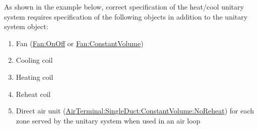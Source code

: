 As shown in the example below, correct specification of the heat/cool unitary system requires specification of the following objects in addition to the unitary system object:

\begin{enumerate}
\def\labelenumi{\arabic{enumi})}
\item
  Fan (\hyperref[fanonoff]{Fan:OnOff} or \hyperref[fanconstantvolume]{Fan:ConstantVolume})
\item
  Cooling coil
\item
  Heating coil
\item
  Reheat coil
\item
  Direct air unit (\hyperref[airterminalsingleductconstantvolumenoreheat]{AirTerminal:SingleDuct:ConstantVolume:NoReheat}) for each zone served by the unitary system when used in an air loop
\end{enumerate}

